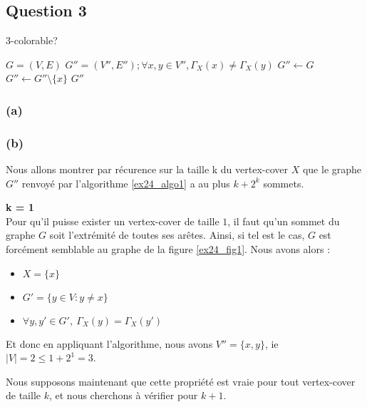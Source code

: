 \subsection{Question 3}\label{ex24_q3}

\begin{center}
\begin{algorithm}[H]
\caption{3-colorable?}\label{ex24_algo1}
\begin{algorithmic}[1]
\REQUIRE $G = (V,E)$
\ENSURE $G'' = (V'',E'') ; \forall x,y \in V'', \Gamma_X(x) \neq \Gamma_X(y)$
	\STATE $G'' \leftarrow G$
		\STATE $G'' \leftarrow G'' \setminus \{x\}$
	\ENDWHILE
\RETURN $G''$
\end{algorithmic}
\end{algorithm}
\end{center}

\subsubsection{(a)}\label{ex24_q3_a}

\subsubsection{(b)}\label{ex24_q3_b}
Nous allons montrer par récurence sur la taille k du vertex-cover $X$ que 
le graphe $G''$ renvoyé par l'algorithme \ref{ex24_algo1} a au
plus $k + 2^k$ sommets.

{\bfseries k = 1}\\
Pour qu'il puisse exister un vertex-cover de taille $1$, il faut qu'un sommet du graphe
$G$ soit l'extrémité de toutes ses arêtes.
Ainsi, si tel est le cas, $G$ est forcément semblable au graphe de la figure
\ref{ex24_fig1}.
Nous avons alors : 
\begin{itemize}
	\item $X = \{x\}$
	\item $G' = \{y \in V : y \neq x\}$
	\item $\forall y,y' \in G',\ \Gamma_X(y) = \Gamma_X(y')$
\end{itemize}
Et donc en appliquant l'algorithme, nous avons $V'' = \{x,y\}$, ie $|V| = 2 \leq 1 + 2^1
= 3$.

Nous supposons maintenant que cette propriété est vraie pour tout vertex-cover de taille
$k$, et nous cherchons à vérifier pour $k+1$.



